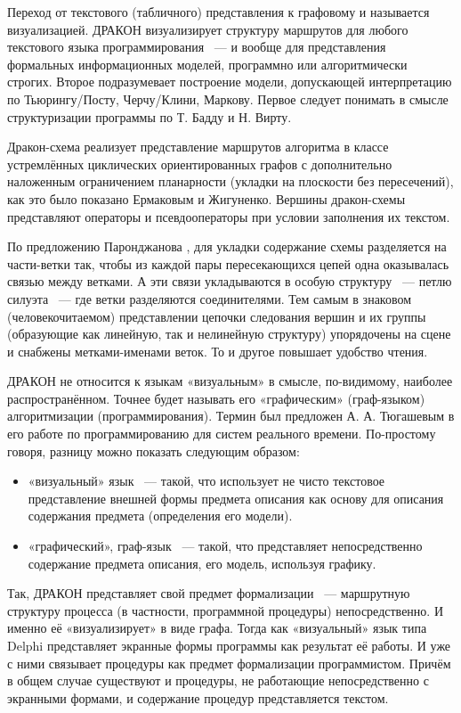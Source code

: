 Переход от текстового (табличного) представления к графовому и называется визуализацией. ДРАКОН визуализирует структуру маршрутов для любого текстового языка программирования ~--- и вообще для представления формальных информационных моделей, программно или алгоритмически строгих. Второе подразумевает построение модели, допускающей интерпретацию по Тьюрингу/Посту, Черчу/Клини, Маркову. \cite{Parondjanov1} Первое следует понимать в смысле структуризации программы по Т. Бадду и Н. Вирту.

Дракон-схема реализует представление маршрутов алгоритма в классе устремлённых циклических ориентированных графов с дополнительно наложенным ограничением планарности (укладки на плоскости без пересечений), как это было показано Ермаковым и Жигуненко. \cite{Ermakov} Вершины дракон-схемы представляют операторы и псевдооператоры при условии заполнения их текстом.

По предложению Паронджанова \cite{Parondjanov1}, для укладки содержание схемы разделяется на части-ветки так, чтобы из каждой пары пересекающихся цепей одна оказывалась связью между ветками. А эти связи укладываются в особую структуру ~--- петлю силуэта ~--- где ветки разделяются соединителями. Тем самым в знаковом (человекочитаемом) представлении цепочки следования вершин и их группы (образующие как линейную, так и нелинейную структуру) упорядочены на сцене и снабжены метками-именами веток. То и другое повышает удобство чтения.

ДРАКОН не относится к языкам «визуальным» в смысле, по-видимому, наиболее распространённом. Точнее будет называть его «графическим» (граф-языком) алгоритмизации (программирования). Термин был предложен А. А. Тюгашевым в его работе \cite{Tugashev} по программированию для систем реального времени.
По-простому говоря, разницу можно показать следующим образом:
\begin{itemize}
\item «визуальный» язык ~--- такой, что использует не чисто текстовое представление внешней формы предмета описания как основу для описания содержания предмета (определения его модели).
\item «графический», граф-язык ~--- такой, что представляет непосредственно содержание предмета описания, его модель, используя графику.
\end{itemize}

Так, ДРАКОН представляет свой предмет формализации ~--- маршрутную структуру процесса (в частности, программной процедуры) непосредственно. И именно её «визуализирует» в виде графа. Тогда как «визуальный» язык типа Delphi представляет экранные формы программы как результат её работы. И уже с ними связывает процедуры как предмет формализации программистом. Причём в общем случае существуют и процедуры, не работающие непосредственно с экранными формами, и содержание процедур представляется текстом.

